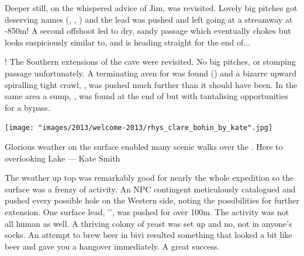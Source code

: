 Deeper still, on the whispered advice of Jim,  was revisited. Lovely big pitches got deserving names (, , ) and the lead was pushed and left going at a streamway at -850m! A second offshoot led to dry, sandy passage which eventually chokes but looks suspiciously similar to, and is heading straight for the end of...

! The Southern extensions of the cave were revisited. No big pitches, or stomping passage unfortunately. A terminating aven for  was found () and a bizarre upward spiralling tight crawl, , was pushed much further than it should have been. In the same area a sump, , was found at the end of  but with tantalising opportunities for a bypass.

\begin{marginfigure}
\texttt{[image: "images/2013/welcome-2013/rhys\_clare\_bohin\_by\_kate".jpg]}
\caption{Glorious weather on the surface enabled many scenic walks over the \protect{}. Here to \protect{} overlooking Lake \protect{} --- Kate Smith}
\label{rhys_clare_bohin}
\end{marginfigure}

The weather up top was remarkably good for nearly the whole expedition so the surface was a frenzy of activity. An NPC contingent meticulously catalogued and pushed every possible hole on the Western side, noting the possibilities for further extension. One surface lead, '', was pushed for over 100m. The activity was not all human as well. A thriving colony of yeast was set up and no, not in anyone’s socks. An attempt to brew beer in bivi resulted something that looked a bit like beer and gave you a hangover immediately. A great success.


